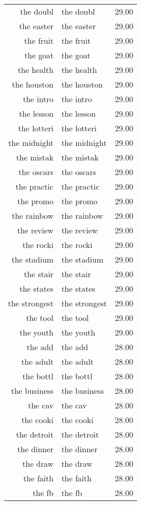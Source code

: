 \begin{table}[ht]
\begin{tabular}{rlr}
  the doubl & the doubl & 29.00 \\ 
  the easter & the easter & 29.00 \\ 
  the fruit & the fruit & 29.00 \\ 
  the goat & the goat & 29.00 \\ 
  the health & the health & 29.00 \\ 
  the houston & the houston & 29.00 \\ 
  the intro & the intro & 29.00 \\ 
  the lesson & the lesson & 29.00 \\ 
  the lotteri & the lotteri & 29.00 \\ 
  the midnight & the midnight & 29.00 \\ 
  the mistak & the mistak & 29.00 \\ 
  the oscars & the oscars & 29.00 \\ 
  the practic & the practic & 29.00 \\ 
  the promo & the promo & 29.00 \\ 
  the rainbow & the rainbow & 29.00 \\ 
  the review & the review & 29.00 \\ 
  the rocki & the rocki & 29.00 \\ 
  the stadium & the stadium & 29.00 \\ 
  the stair & the stair & 29.00 \\ 
  the states & the states & 29.00 \\ 
  the strongest & the strongest & 29.00 \\ 
  the tool & the tool & 29.00 \\ 
  the youth & the youth & 29.00 \\ 
  the add & the add & 28.00 \\ 
  the adult & the adult & 28.00 \\ 
  the bottl & the bottl & 28.00 \\ 
  the business & the business & 28.00 \\ 
  the cav & the cav & 28.00 \\ 
  the cooki & the cooki & 28.00 \\ 
  the detroit & the detroit & 28.00 \\ 
  the dinner & the dinner & 28.00 \\ 
  the draw & the draw & 28.00 \\ 
  the faith & the faith & 28.00 \\ 
  the fb & the fb & 28.00 \\ 

\end{tabular}
\end{table}
